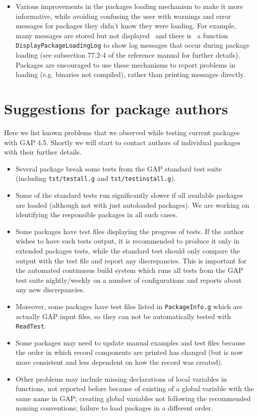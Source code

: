\documentclass[10pt]{article}
\begin{document}
\begin{itemize}
\item
Various improvements in the packages loading mechanism to make it more
informative, while avoiding confusing the user with warnings and error 
messages for packages they didn't
know they were loading. For example, many messages are stored but not 
displayed \, and there is \, a function {\tt DisplayPackageLoadingLog} to show 
log messages that 
occur during package loading (see subsection 77.2-4 of the reference manual for further details).  
Packages are encouraged 
to use these mechanisms to report problems in loading (e.g. binaries not compiled), rather than printing messages directly.
\end{itemize}


\section{Suggestions for package authors}

Here we list known problems that we observed while testing current packages 
with GAP 4.5. Shortly we will start to contact authors of individual 
packages with their further details.

\begin{itemize}

\item
Several package break some tests from the GAP standard test suite 
(including \verb|tst/testall.g| and \verb|tst/testinstall.g|).

\item
Some of the standard tests run 
significantly slower if all available packages are loaded (although not with 
just autoloaded packages). 
We are working on identifying  the responsible packages in all such cases.

\item
Some packages have test files displaying the progress of tests. If the 
author wishes to have such tests output, it is recommended to produce it only
in extended packages tests, while the standard test should only compare the 
output with the test file and report any discrepancies. This is important for
the automated continuous build system which runs all tests from the GAP test
suite nightly/weekly on a number of configurations and reports about any new
discrepancies. 

\item
Moreover, some packages have test files listed in {\tt PackageInfo.g}
which are actually GAP input files, so they can not be automatically tested
with {\tt ReadTest}.

\item
Some packages may need to update manual examples and test files
 because the order in which record components are 
printed has changed (but is now more consistent and less dependent on how the record was created).


\item
Other problems may include missing declarations of local variables in 
functions, not reported before because of existing of a global variable with
the same name in GAP; creating global variables not following the recommended 
naming conventions; failure to load packages in a different order.
\end{itemize}
\end{document}
